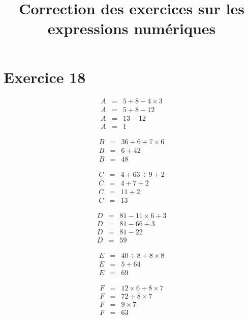 \documentclass[12pt,a4paper]{extarticle}
\date{}
\title{Correction des exercices sur les expressions numériques}
\begin{document}
\maketitle



 \vspace*{-1cm}
\section*{Exercice 18}
 \vspace*{-1cm}
 
 
\begin{multicols}{3}
	\begin{eqnarray*}
		A &=&  5 + 8 - 4 \times 3 \\
		A &=& 5 + 8 - 12 \\
		A &=& 13 - 12 \\
		A &=& 1
	\end{eqnarray*}

	\begin{eqnarray*}
		B &=& 36 \div 6 + 7 \times 6 \\
		B &=& 6 + 42 \\
		B &=& 48 
	\end{eqnarray*}

	\begin{eqnarray*}
		C &=& 4 + 63 \div 9 + 2 \\
		C &=& 4 + 7 + 2 \\
		C &=& 11 + 2 \\
		C &=& 13
	\end{eqnarray*}

	\begin{eqnarray*}
		D &=&  81 - 11 \times 6 \div 3 \\
		D &=& 81 - 66 \div 3 \\
		D &=& 81 - 22 \\
		D &=& 59
	\end{eqnarray*}

	\begin{eqnarray*}
		E &=& 40 \div 8 + 8 \times 8 \\
		E &=& 5 + 64 \\
		E &=& 69
	\end{eqnarray*}

	\begin{eqnarray*}
		F &=&  12 \times 6 \div 8 \times 7 \\
		F &=& 72 \div 8 \times 7 \\
		F &=& 9 \times 7 \\
		F &=& 63
	\end{eqnarray*}
\end{multicols}
\end{document}
